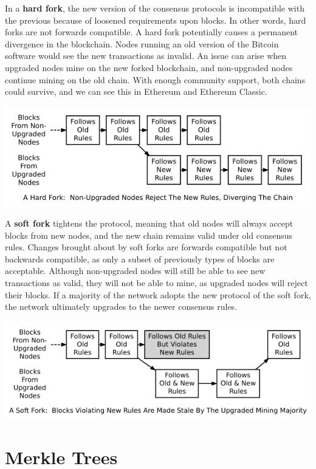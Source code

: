 \documentclass[full.tex]{subfiles}
\begin{document}
   In a \textbf{hard fork}, the new version of the consensus protocols is incompatible with the previous because of loosened requirements upon blocks. In other words, hard forks are not forwards compatible. A hard fork potentially causes a permanent divergence in the blockchain. Nodes running an old version of the Bitcoin software would see the new transactions as invalid. An issue can arise when upgraded nodes mine on the new forked blockchain, and non-upgraded nodes continue mining on the old chain. With enough community support, both chains could survive, and we can see this in Ethereum and Ethereum Classic.
   
   \smallskip
   \includegraphics[scale=0.9]{hard_fork}
   \smallskip
   
   A \textbf{soft fork} tightens the protocol, meaning that old nodes will always accept blocks from new nodes, and the new chain remains valid under old consensus rules. Changes brought about by soft forks are forwards compatible but not backwards compatible, as only a subset of previously types of blocks are acceptable. Although non-upgraded nodes will still be able to see new transactions as valid, they will not be able to mine, as upgraded nodes will reject their blocks. If a majority of the network adopts the new protocol of the soft fork, the network ultimately upgrades to the newer consensus rules.
   
   \medskip   
   \includegraphics[scale=0.9]{soft_fork}
  
   \section*{Merkle Trees}
  
\end{document}
